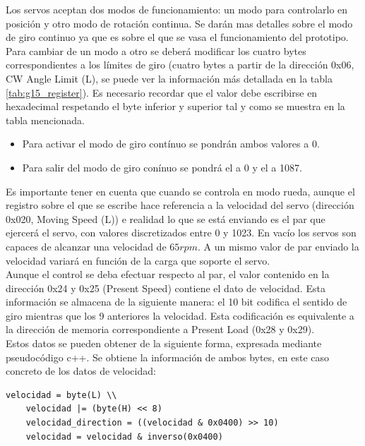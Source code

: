 		Los servos aceptan dos modos de funcionamiento: un modo para controlarlo en posición y otro modo de rotación continua. Se darán mas detalles sobre el modo de giro continuo ya que es sobre el que se vasa el funcionamiento del prototipo.
		\\
		
		Para cambiar de un modo a otro se deberá modificar los cuatro bytes correspondientes a los límites de giro (cuatro bytes a partir de la dirección 0x06, CW Angle Limit (L), se puede ver la información más detallada en la tabla \ref{tab:g15_register}). Es necesario recordar que el valor debe escribirse en hexadecimal respetando el byte inferior y superior tal y como se muestra en la tabla mencionada.
		
		\begin{itemize}
			\item Para activar el modo de giro contínuo se pondrán ambos valores a 0.
			\item Para salir del modo de giro conínuo se pondrá el  a 0 y el  a 1087.
		\end{itemize}
		
		Es importante tener en cuenta que cuando se controla en modo rueda, aunque el registro sobre el que se escribe hace referencia a la velocidad del servo (dirección 0x020, Moving Speed (L)) e realidad lo que se está enviando es el par que ejercerá el servo, con valores discretizados entre 0 y 1023. En vacío los servos son capaces de alcanzar una velocidad de $65rpm$. A un mismo valor de par enviado la velocidad variará en función de la carga que soporte el servo.
		\\ 
		
		Aunque el control se deba efectuar respecto al par, el valor contenido en la dirección 0x24 y 0x25 (Present Speed) contiene el dato de velocidad. Esta información se almacena de la siguiente manera: el 10 bit codifica el sentido de giro mientras que los 9 anteriores la velocidad. Esta codificación es equivalente a la dirección de memoria correspondiente a Present Load (0x28 y 0x29). 
		\\
		
		Estos datos se pueden obtener de la siguiente forma, expresada mediante pseudocódigo c++. Se obtiene la información de ambos bytes, en este caso concreto de los datos de velocidad: 
		\begin{lstlisting}[frame=single]
	velocidad = byte(L) \\
	velocidad |= (byte(H) << 8)
	velocidad_direction = ((velocidad & 0x0400) >> 10)
	velocidad = velocidad & inverso(0x0400)
		\end{lstlisting}
		
